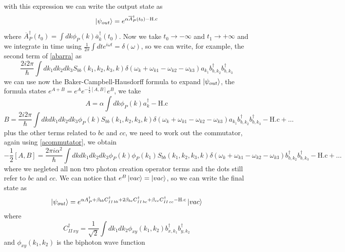 with this expression we can write the output state as
\begin{equation}\ket{\psi_{out}} = e^{\alpha \overline{A}_P^\dagger(t_0)-\text{H.c}}\end{equation}
where $\overline{A}_P^\dagger(t_0) = \int dk \phi_P(k)\overline{a}_k^\dagger(t_0)$. Now we take $t_0\to -\infty$ and $t_1 \to +\infty$ and we integrate in time using $\frac{1}{2\pi} \int dt e^{i\omega t} = \delta(\omega)$, so we can write, for example, the second term of \eqref{abarra} as
\begin{equation}\frac{2i2\pi }{\hbar}\int dk_1dk_2 dk_3S_{bb}(k_1,k_2,k_3,k)\delta(\omega_{k}+\omega_{k1}-\omega_{k2}-\omega_{k3})a_{k_1}b_{b,k_2}^\dagger b_{b,k_3}^\dagger \end{equation}
we can use now the Baker-Campbell-Hausdorff formula to expand $\ket{\psi_{out}}$, the formula states $e^{A+B} = e^{A}e^{-\frac{1}{2}[A,B]} e^{B}$, we take 
\begin{equation}A =\alpha \int dk \phi_P(k)a_k^\dagger - \text{H.c} \end{equation}
\begin{equation}B = \frac{2i2\pi }{\hbar}\int dk dk_1dk_2 dk_3\phi_P(k)S_{bb}(k_1,k_2,k_3,k)\delta(\omega_{k}+\omega_{k1}-\omega_{k2}-\omega_{k3})a_{k_1}b_{b,k_2}^\dagger b_{b,k_3}^\dagger -\text{H.c} +\dots\end{equation}
plus the other terms related to $bc$ and $cc$, we need to work out the commutator, again using \eqref{acommutator}, we obtain
\begin{equation}-\frac{1}{2}[A,B] = \frac{2\pi i \alpha^2}{\hbar}\int dk dk_1dk_2 dk_3\phi_P(k)\phi_P(k_1)S_{bb}(k_1,k_2,k_3,k)\delta(\omega_{k}+\omega_{k1}-\omega_{k2}-\omega_{k3})b_{b,k_2}^\dagger b_{b,k_3}^\dagger -\text{H.c} +\dots\end{equation}
where we negleted all non two photon creation operator terms and the dots still refer to $bc$ and $cc$. We can notice that $e^B\ket{vac} = \ket{vac}$, so we can write the final state as
\begin{equation}\ket{\psi_{out}} = e^{\alpha A_P^\dagger + \beta_{bb} C^\dagger_{II\,bb}+ 2\beta_{bc} C^\dagger_{II\,bc}+ \beta_{cc} C^\dagger_{II\,cc}-\text{H.c}}\ket{vac}\end{equation}
where
\begin{equation}C^\dagger_{II\, xy} = \frac{1}{\sqrt{2}}\int dk_1 dk_2 \phi_{xy}(k_1,k_2)b_{x,k_1}^\dagger b_{y,k_2}^\dagger \end{equation}
and $\phi_{xy}(k_1,k_2)$ is the biphoton wave function 
